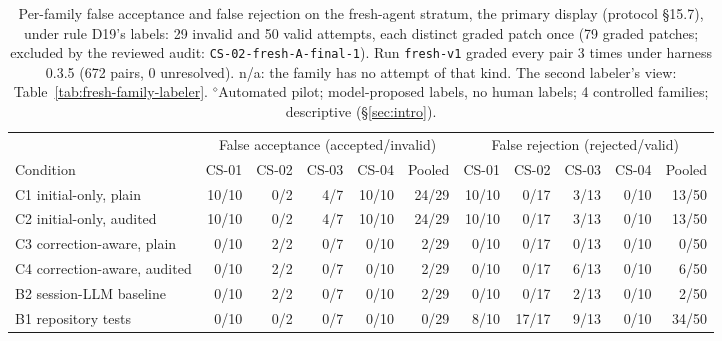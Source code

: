 \begin{table}[t]\centering\footnotesize\setlength{\tabcolsep}{4pt}
\caption{Per-family false acceptance and false rejection on the fresh-agent stratum, the primary display (protocol \S15.7), under rule D19's labels: 29 invalid and 50 valid attempts, each distinct graded patch once (79 graded patches; excluded by the reviewed audit: \texttt{CS-02-fresh-A-final-1}). Run \texttt{fresh-v1} graded every pair 3 times under harness 0.3.5 (672 pairs, 0 unresolved). n/a: the family has no attempt of that kind. The second labeler's view: Table~\ref{tab:fresh-family-labeler}. $^{\diamond}$Automated pilot; model-proposed labels, no human labels; 4 controlled families; descriptive (\S\ref{sec:intro}).}\label{tab:fresh-family}
\begin{tabular}{lrrrrrrrrrr}\toprule  & \multicolumn{5}{c}{False acceptance (accepted/invalid)} & \multicolumn{5}{c}{False rejection (rejected/valid)} \\\cmidrule(lr){2-6}\cmidrule(lr){7-11} Condition & CS-01 & CS-02 & CS-03 & CS-04 & Pooled & CS-01 & CS-02 & CS-03 & CS-04 & Pooled \\\midrule
C1 initial-only, plain & 10/10 & 0/2 & 4/7 & 10/10 & 24/29 & 10/10 & 0/17 & 3/13 & 0/10 & 13/50 \\
C2 initial-only, audited & 10/10 & 0/2 & 4/7 & 10/10 & 24/29 & 10/10 & 0/17 & 3/13 & 0/10 & 13/50 \\
C3 correction-aware, plain & 0/10 & 2/2 & 0/7 & 0/10 & 2/29 & 0/10 & 0/17 & 0/13 & 0/10 & 0/50 \\
C4 correction-aware, audited & 0/10 & 2/2 & 0/7 & 0/10 & 2/29 & 0/10 & 0/17 & 6/13 & 0/10 & 6/50 \\
B2 session-LLM baseline & 0/10 & 2/2 & 0/7 & 0/10 & 2/29 & 0/10 & 0/17 & 2/13 & 0/10 & 2/50 \\
B1 repository tests & 0/10 & 0/2 & 0/7 & 0/10 & 0/29 & 8/10 & 17/17 & 9/13 & 0/10 & 34/50 \\
\bottomrule\end{tabular}\end{table}
